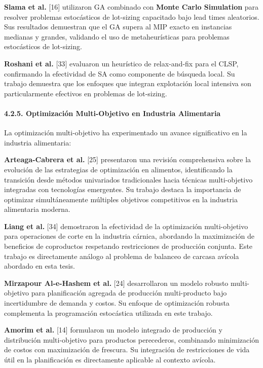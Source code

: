 \documentclass[
  spanish,
  12pt,
]{article}
\begin{document}
\textbf{Slama et al.} {[}16{]} utilizaron GA combinado con \textbf{Monte
Carlo Simulation} para resolver problemas estocásticos de lot-sizing
capacitado bajo lead times aleatorios. Sus resultados demuestran que el
GA supera al MIP exacto en instancias medianas y grandes, validando el
uso de metaheurísticas para problemas estocásticos de lot-sizing.

\textbf{Roshani et al.} {[}33{]} evaluaron un heurístico de
relax-and-fix para el CLSP, confirmando la efectividad de SA como
componente de búsqueda local. Su trabajo demuestra que los enfoques que
integran explotación local intensiva son particularmente efectivos en
problemas de lot-sizing.

\paragraph{4.2.5. Optimización Multi-Objetivo en Industria
Alimentaria}\label{optimizaciuxf3n-multi-objetivo-en-industria-alimentaria}

La optimización multi-objetivo ha experimentado un avance significativo
en la industria alimentaria:

\textbf{Arteaga-Cabrera et al.} {[}25{]} presentaron una revisión
comprehensiva sobre la evolución de las estrategias de optimización en
alimentos, identificando la transición desde métodos univariados
tradicionales hacia técnicas multi-objetivo integradas con tecnologías
emergentes. Su trabajo destaca la importancia de optimizar
simultáneamente múltiples objetivos competitivos en la industria
alimentaria moderna.

\textbf{Liang et al.} {[}34{]} demostraron la efectividad de la
optimización multi-objetivo para operaciones de corte en la industria
cárnica, abordando la maximización de beneficios de coproductos
respetando restricciones de producción conjunta. Este trabajo es
directamente análogo al problema de balanceo de carcasa avícola abordado
en esta tesis.

\textbf{Mirzapour Al-e-Hashem et al.} {[}24{]} desarrollaron un modelo
robusto multi-objetivo para planificación agregada de producción
multi-producto bajo incertidumbre de demanda y costos. Su enfoque de
optimización robusta complementa la programación estocástica utilizada
en este trabajo.

\textbf{Amorim et al.} {[}14{]} formularon un modelo integrado de
producción y distribución multi-objetivo para productos perecederos,
combinando minimización de costos con maximización de frescura. Su
integración de restricciones de vida útil en la planificación es
directamente aplicable al contexto avícola.
\end{document}
